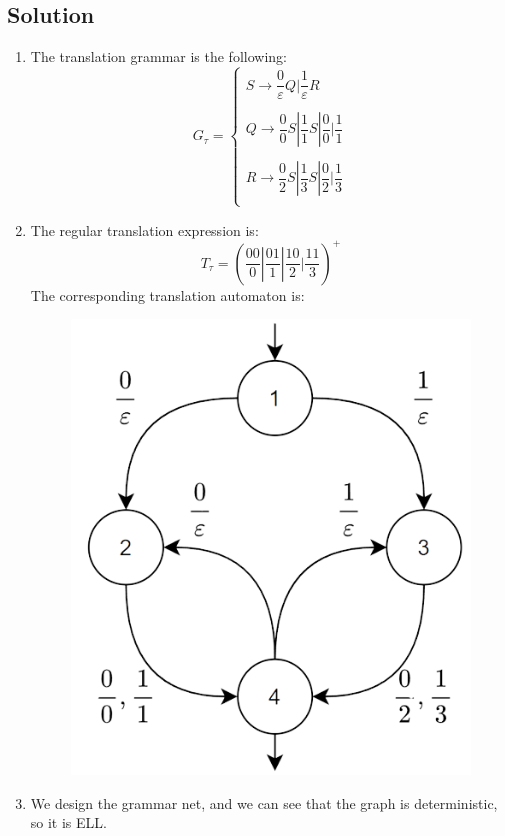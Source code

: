 \documentclass[12pt, a4paper]{report}
\newtheorem[style=M, bodystyle=\normalfont]{theorem}{Theorem}
\newtheorem[style=M, bodystyle=\normalfont]{corollary}{Corollary}
\newtheorem[style=M, bodystyle=\normalfont]{lemma}{Lemma}
\newtheorem[style=M, bodystyle=\normalfont]{definition}{Definition}
\begin{document}
    \subsection*{Solution}
        \begin{enumerate}
            \item The translation grammar is the following: 
                \[G_{\tau}=\begin{cases}
                    S \rightarrow \dfrac{0}{\varepsilon}Q|\dfrac{1}{\varepsilon}R     \\
                    \\
                    Q \rightarrow \dfrac{0}{0}S|\dfrac{1}{1}S|\dfrac{0}{0}|\dfrac{1}{1} \\
                    \\
                    R \rightarrow \dfrac{0}{2}S|\dfrac{1}{3}S|\dfrac{0}{2}|\dfrac{1}{3} \\
                \end{cases}\]
            \item The regular translation expression is: 
                \[T_{\tau}=\left( \dfrac{00}{0}|\dfrac{01}{1}| \dfrac{10}{2}|\dfrac{11}{3}\right)^{+}\]
                The corresponding translation automaton is: 
                \begin{figure}[H]
                    \centering
                    \includegraphics[width=0.4\linewidth]{images/gram.png}
                \end{figure} 
            \item We design the grammar net, and we can see that the graph is deterministic, so it is ELL.     
        \end{enumerate}
\end{document}
